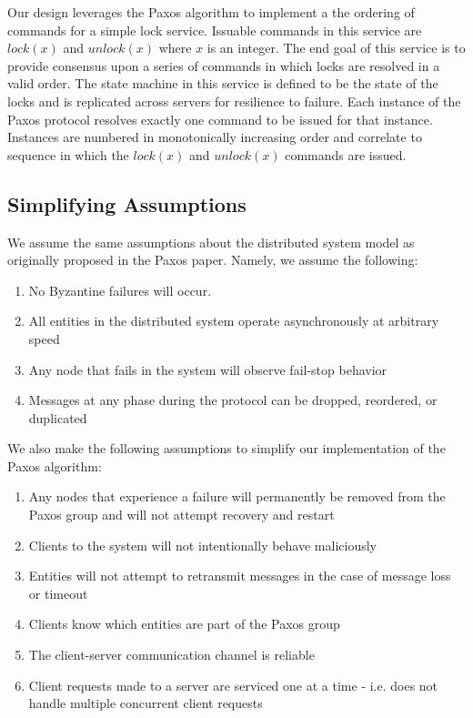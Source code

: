 \documentclass{article}
\begin{document}
Our design leverages the Paxos algorithm to implement a the ordering of commands for a simple lock service.
Issuable commands in this service are $lock(x)$ and $unlock(x)$ where $x$ is an integer.
The end goal of this service is to provide consensus upon a series of commands in which locks are resolved in a valid order.
The state machine in this service is defined to be the state of the locks and is replicated across servers for resilience to failure.
Each instance of the Paxos protocol resolves exactly one command to be issued for that instance.
Instances are numbered in monotonically increasing order and correlate to sequence in which the $lock(x)$ and $unlock(x)$ commands are issued.

\subsection{Simplifying Assumptions}

We assume the same assumptions about the distributed system model as originally proposed in the Paxos paper. Namely, we assume the following:

\begin{enumerate}
\item No Byzantine failures will occur.
\item All entities in the distributed system operate asynchronously at arbitrary speed
\item Any node that fails in the system will observe fail-stop behavior
\item Messages at any phase during the protocol can be dropped, reordered, or duplicated
\end{enumerate}

We also make the following assumptions to simplify our implementation of the Paxos algorithm:

\begin{enumerate}
\item Any nodes that experience a failure will permanently be removed from the Paxos group and will not attempt recovery and restart
\item Clients to the system will not intentionally behave maliciously
\item Entities will not attempt to retransmit messages in the case of message loss or timeout
\item Clients know which entities are part of the Paxos group
\item The client-server communication channel is reliable
\item Client requests made to a server are serviced one at a time - i.e. does not handle multiple concurrent client requests
\end{enumerate}
\end{document}

